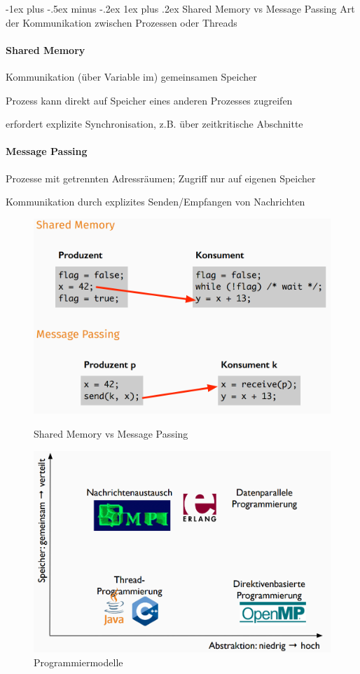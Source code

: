 \documentclass[10pt]{article}
\makeatletter
\renewcommand{\subsubsection}{\@startsection{subsubsection}{3}{0mm}%
                                {-1ex plus -.5ex minus -.2ex}%
                                {1ex plus .2ex}%
                                {\normalfont\small\bfseries}}
\makeatother
\begin{document}
\subsubsection{Shared Memory vs Message Passing}
Art der Kommunikation zwischen Prozessen oder Threads
\paragraph{Shared Memory}
\begin{itemize*}
  \item Kommunikation (über Variable im) gemeinsamen Speicher
  \item Prozess kann direkt auf Speicher eines anderen Prozesses zugreifen
  \item erfordert explizite Synchronisation, z.B. über zeitkritische Abschnitte
\end{itemize*}
\paragraph{Message Passing}
\begin{itemize*}
  \item Prozesse mit getrennten Adressräumen; Zugriff nur auf eigenen Speicher
  \item Kommunikation durch explizites Senden/Empfangen von Nachrichten
\end{itemize*}

\begin{figure}[!tbp]
  \centering
  \begin{minipage}[b]{0.45\textwidth}
    \includegraphics[width=0.4\linewidth]{Assets/Programmierparadigmen-Shared-Memory-vs-Message-Passing}
    \caption{Shared Memory vs Message Passing}
  \end{minipage}
  \hfill
  \begin{minipage}[b]{0.45\textwidth}
    \includegraphics[width=0.9\linewidth]{Assets/Programmierparadigmen-Programmiermodelle}
    \caption{Programmiermodelle}
  \end{minipage}
\end{figure}
\end{document}
